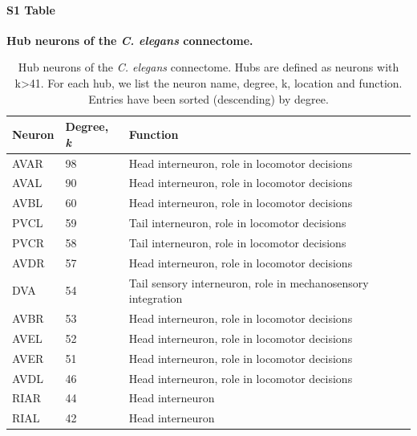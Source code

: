\documentclass[10pt,letterpaper]{article}
\begin{document}
\paragraph*{S1 Table}
{\bf Hub neurons of the \textit{C. elegans} connectome.} 
\begin{table}[]
\centering
\caption{Hub neurons of the \textit{C. elegans} connectome. 
Hubs are defined as neurons with k>41. For each
hub, we list the neuron name, degree, k, location and function. 
Entries have been sorted (descending) by degree.}
\label{tab:HubList}
\begin{tabular}{lll}
\hline
\textbf{Neuron} & \textbf{Degree, \textit{k}} & \textbf{Function}                                                     \\ \hline
AVAR   & 98        & Head interneuron, role in locomotor decisions                \\
AVAL   & 90        & Head interneuron, role in locomotor decisions                \\
AVBL   & 60        & Head interneuron, role in locomotor decisions                \\
PVCL   & 59        & Tail interneuron, role in locomotor decisions                \\
PVCR   & 58        & Tail interneuron, role in locomotor decisions                \\
AVDR   & 57        & Head interneuron, role in locomotor decisions                \\
DVA    & 54        & Tail sensory interneuron, role in mechanosensory integration \\
AVBR   & 53        & Head interneuron, role in locomotor decisions                \\
AVEL   & 52        & Head interneuron, role in locomotor decisions                \\
AVER   & 51        & Head interneuron, role in locomotor decisions                \\
AVDL   & 46        & Head interneuron, role in locomotor decisions                \\
RIAR   & 44        & Head interneuron                                             \\
RIAL   & 42        & Head interneuron                                             \\ \hline
\end{tabular}
\end{table}
\end{document}
